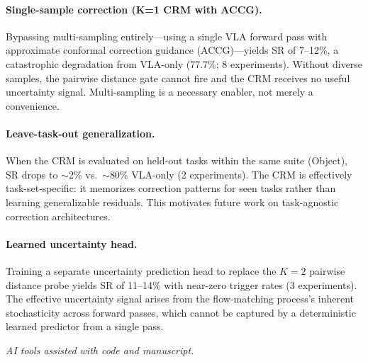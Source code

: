 \paragraph{Single-sample correction (K=1 CRM with ACCG).}
Bypassing multi-sampling entirely---using a single VLA forward pass with approximate conformal correction guidance (ACCG)---yields SR of 7--12\%, a catastrophic degradation from VLA-only (77.7\%; 8 experiments). Without diverse samples, the pairwise distance gate cannot fire and the CRM receives no useful uncertainty signal. Multi-sampling is a necessary enabler, not merely a convenience.

\paragraph{Leave-task-out generalization.}
When the CRM is evaluated on held-out tasks within the same suite (Object), SR drops to ${\sim}$2\% vs.\ ${\sim}$80\% VLA-only (2 experiments). The CRM is effectively task-set-specific: it memorizes correction patterns for seen tasks rather than learning generalizable residuals. This motivates future work on task-agnostic correction architectures.

\paragraph{Learned uncertainty head.}
Training a separate uncertainty prediction head to replace the $K{=}2$ pairwise distance probe yields SR of 11--14\% with near-zero trigger rates (3 experiments). The effective uncertainty signal arises from the flow-matching process's inherent stochasticity across forward passes, which cannot be captured by a deterministic learned predictor from a single pass.

\smallskip\noindent\textit{AI tools assisted with code and manuscript.}
